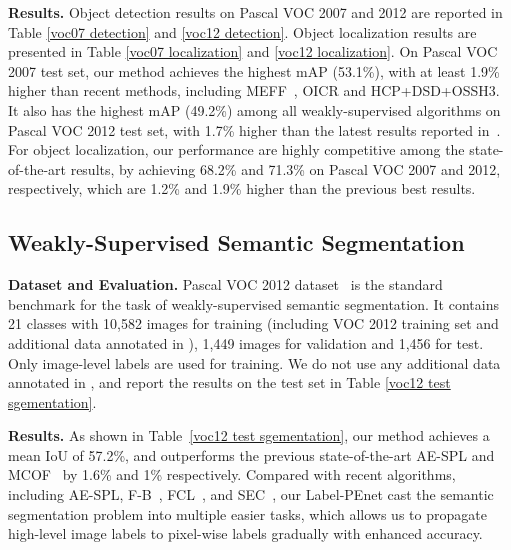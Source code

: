 \documentclass[10pt,twocolumn,letterpaper]{article}
\begin{document}
\vspace{-0mm}

\noindent\textbf{Results.} Object detection results on Pascal VOC 2007 and 2012 are reported in Table \ref{voc07 detection} and \ref{voc12 detection}. Object localization results are presented in Table \ref{voc07 localization} and \ref{voc12 localization}. On Pascal VOC 2007 test set, our method achieves the highest mAP (53.1\%), with at least 1.9\% higher than recent methods, including MEFF~\cite{ge2018multi}, OICR\cite{tang2017multiple} and HCP+DSD+OSSH3\cite{jie2017deep}. It also has the highest mAP (49.2\%) among all weakly-supervised algorithms on Pascal VOC 2012 test set,
with 1.7\% higher than the latest results reported in~\cite{ge2018multi}. For object localization, our performance are highly competitive among the state-of-the-art results, by achieving  68.2\% and 71.3\% on Pascal VOC 2007 and 2012, respectively, which are 1.2\% and 1.9\% higher than the previous best results.

\subsection{Weakly-Supervised Semantic Segmentation}
\noindent\textbf{Dataset and Evaluation.} Pascal VOC 2012 dataset~\cite{everingham2015pascal} is the standard benchmark for the task of weakly-supervised semantic segmentation. It contains 21 classes with 10,582 images for training (including VOC 2012 training set and additional data annotated in \cite{hariharan2011semantic}), 1,449 images for validation and 1,456 for test. Only image-level labels are used for training. We do not use any additional data annotated in \cite{hariharan2011semantic}, and report the results on the test set in Table \ref{voc12 test sgementation}.

\noindent\textbf{Results.} As shown in Table~\ref{voc12 test sgementation}, our method achieves a mean IoU of 57.2\%, and outperforms the previous state-of-the-art AE-SPL\cite{wei2017object} and MCOF~\cite{wang2018weakly} by 1.6\% and 1\% respectively. Compared with recent algorithms, including AE-SPL\cite{wei2017object}, F-B~\cite{saleh2016built}, FCL~\cite{roy2017combining}, and SEC~\cite{kolesnikov2016seed}, our Label-PEnet cast the semantic segmentation problem into multiple easier tasks, which allows us to propagate high-level image labels to pixel-wise labels gradually with enhanced accuracy.
\end{document}
